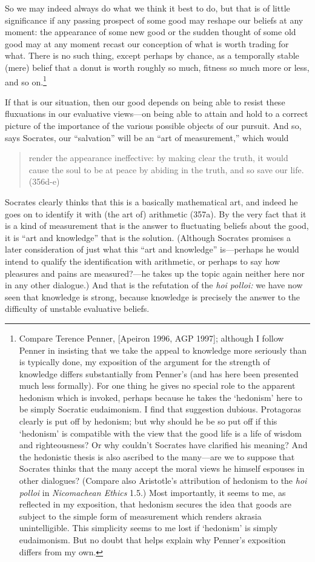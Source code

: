 \documentclass[11pt]{amsart}
\begin{document}
So we may indeed always do what we think it best to do, but that is of
little significance if any passing prospect of some good may reshape
our beliefs at any moment: the appearance of some new good or the
sudden thought of some old good may at any moment recast our
conception of what is worth trading for what. There is no such thing,
except perhaps by chance, as a temporally stable (mere) belief that a
donut is worth roughly so much, fitness so much more or less, and so
on.\footnote{Compare Terence Penner, [Apeiron 1996, AGP 1997];
although I follow Penner in insisting that we take the appeal to
knowledge more seriously than is typically done, my exposition of the
argument for the strength of knowledge differs substantially from
Penner's (and has here been presented much less formally). For one
thing he gives no special role to the apparent hedonism which is
invoked, perhaps because he takes the `hedonism' here to be simply
Socratic eudaimonism. I find that suggestion dubious. Protagoras
clearly is put off by hedonism; but why should he be so put off if
this `hedonism' is compatible with the view that the good life is a
life of wisdom and righteousness? Or why couldn't Socrates have
clarified his meaning? And the hedonistic thesis is also ascribed to
the many---are we to suppose that Socrates thinks that the many accept
the moral views he himself espouses in other dialogues? (Compare also
Aristotle's attribution of hedonism to the \emph{hoi polloi} in
\emph{Nicomachean Ethics} 1.5.) Most importantly, it seems to me, as
reflected in my exposition, that hedonism secures the idea that goods
are subject to the simple form of measurement which renders akrasia
unintelligible. This simplicity seems to me lost if `hedonism' is
simply eudaimonism. But no doubt that helps explain why Penner's
exposition differs from my own.}

If that is our situation, then our good depends on being able to
resist these fluxuations in our evaluative views---on being able to
attain and hold to a correct picture of the importance of the various
possible objects of our pursuit. And so, says Socrates, our
``salvation'' will be an ``art of measurement,'' which would
\begin{quote} render the appearance ineffective: by making clear the
truth, it would cause the soul to be at peace by abiding in the truth,
and so save our life. (356d-e)\end{quote} Socrates clearly thinks that
this is a basically mathematical art, and indeed he goes on to
identify it with (the art of) arithmetic (357a). By the very fact that
it is a kind of measurement that is the answer to fluctuating beliefs
about the good, it is ``art and knowledge'' that is the solution.
(Although Socrates promises a later consideration of just what this
``art and knowledge'' is---perhaps he would intend to qualify the
identification with arithmetic, or perhaps to say how pleasures and
pains are measured?---he takes up the topic again neither here nor in
any other dialogue.) And that is the refutation of the \emph{hoi
polloi:} we have now seen that knowledge is strong, because knowledge
is precisely the answer to the difficulty of unstable evaluative
beliefs.
\end{document}
